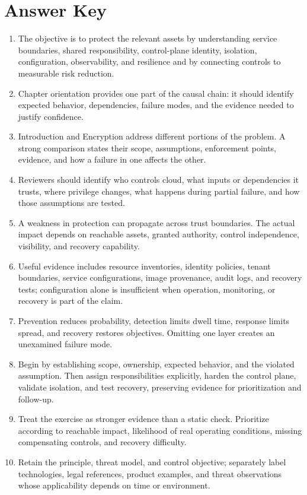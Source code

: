 \documentclass[11pt,letterpaper]{article}
\begin{document}
\section*{Answer Key}
\begin{enumerate}
\item The objective is to protect the relevant assets by understanding service boundaries, shared responsibility, control-plane identity, isolation, configuration, observability, and resilience and by connecting controls to measurable risk reduction.
\item Chapter orientation provides one part of the causal chain: it should identify expected behavior, dependencies, failure modes, and the evidence needed to justify confidence.
\item Introduction and Encryption address different portions of the problem. A strong comparison states their scope, assumptions, enforcement points, evidence, and how a failure in one affects the other.
\item Reviewers should identify who controls cloud, what inputs or dependencies it trusts, where privilege changes, what happens during partial failure, and how those assumptions are tested.
\item A weakness in protection can propagate across trust boundaries. The actual impact depends on reachable assets, granted authority, control independence, visibility, and recovery capability.
\item Useful evidence includes resource inventories, identity policies, tenant boundaries, service configurations, image provenance, audit logs, and recovery tests; configuration alone is insufficient when operation, monitoring, or recovery is part of the claim.
\item Prevention reduces probability, detection limits dwell time, response limits spread, and recovery restores objectives. Omitting one layer creates an unexamined failure mode.
\item Begin by establishing scope, ownership, expected behavior, and the violated assumption. Then assign responsibilities explicitly, harden the control plane, validate isolation, and test recovery, preserving evidence for prioritization and follow-up.
\item Treat the exercise as stronger evidence than a static check. Prioritize according to reachable impact, likelihood of real operating conditions, missing compensating controls, and recovery difficulty.
\item Retain the principle, threat model, and control objective; separately label technologies, legal references, product examples, and threat observations whose applicability depends on time or environment.
\end{enumerate}
\end{document}
